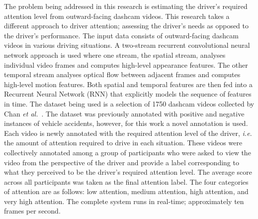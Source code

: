 The problem being addressed in this research is estimating the driver's required attention level from outward-facing dashcam videos. This research takes a different approach to driver attention; assessing the driver's needs as opposed to the driver's performance. The input data consists of outward-facing dashcam videos in various driving situations. A two-stream recurrent convolutional neural network approach is used where one stream, the spatial stream, analyses individual video frames and computes high-level appearance features. The other temporal stream analyses optical flow between adjacent frames and computes high-level motion features. Both spatial and temporal features are then fed into a Recurrent Neural Network (RNN) that explicitly models the sequence of features in time. The dataset being used is a selection of 1750 dashcam videos collected by Chan \emph{et al.}~\cite{Chan2017}. The dataset was previously annotated with positive and negative instances of vehicle accidents, however, for this work a novel annotation is used. Each video is newly annotated with the required attention level of the driver, \emph{i.e.} the amount of attention required to drive in each situation. These videos were collectively annotated among a group of participants who were asked to view the video from the perspective of the driver and provide a label corresponding to what they perceived to be the driver's required attention level. The average score across all participants was taken as the final attention label. The four categories of attention are as follows: low attention, medium attention, high attention, and very high attention. The complete system runs in real-time; approximately ten frames per second.
